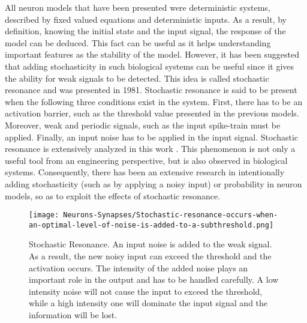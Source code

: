 \documentclass[12pt]{report}
\begin{document}
All neuron models that have been presented were deterministic systems, described by fixed valued equations and deterministic inputs. As a result, by definition, knowing the initial state and the input signal, the response of the model can be deduced. This fact can be useful as it helps understanding important features as the stability of the model. However, it has been suggested that adding stochasticity in such biological systems can be useful since it gives the ability for weak signals to be detected. This idea is called stochastic resonance and was presented in 1981. Stochastic resonance is said to be present when the following three conditions exist in the system. First, there has to be an activation barrier, such as the threshold value presented in the previous models. Moreover, weak and periodic signals, such as the input spike-train must be applied. Finally, an input noise has to be applied in the input signal. Stochastic resonance is extensively analyzed in this work \cite{Gammaitoni1998}. This phenomenon is not only a useful tool from an engineering perspective, but is also observed in biological systems\cite{Honggi2002}. Consequently, there has been an extensive research in intentionally adding stochasticity (such as by applying a noisy input) or probability in neuron models, so as to exploit the effects of stochastic resonance.

\begin{figure}[htp]
    \centering
    \texttt{[image: Neurons-Synapses/Stochastic-resonance-occurs-when-an-optimal-level-of-noise-is-added-to-a-subthreshold.png]}
    \caption{Stochastic Resonance. An input noise is added to the weak signal. As a result, the new noisy input can exceed the threshold and the activation occurs. The intensity of the added noise plays an important role in the output and has to be handled carefully. A low intensity noise will not cause the input to exceed the threshold, while a high intensity one will dominate the input signal and the information will be lost.}
    \label{fig:lif-neuron}
\end{figure}
\end{document}
